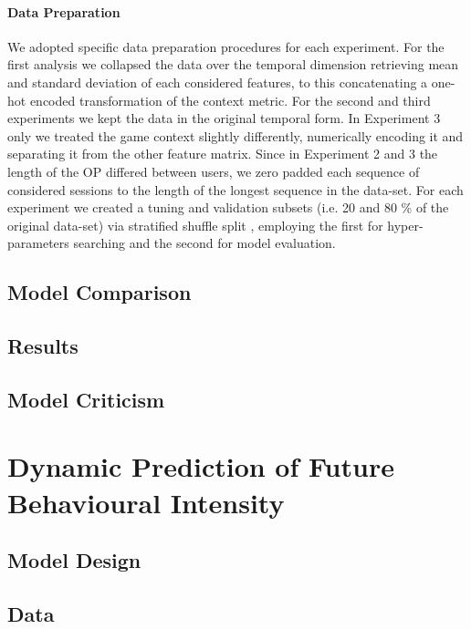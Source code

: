 \paragraph*{Data Preparation}We adopted specific data preparation procedures for each experiment. For the first analysis we collapsed the data over the temporal dimension retrieving mean and standard deviation of each considered features, to this concatenating a one-hot encoded transformation of the context metric. For the second and third experiments we kept the data in the original temporal form. In Experiment 3 only we treated the game context slightly differently, numerically encoding it and separating it from the other feature matrix. Since in Experiment 2 and 3 the length of the OP differed between users, we zero padded each sequence of considered sessions to the length of the longest sequence in the data-set. For each experiment we created a tuning and validation subsets (i.e. 20 and 80 \% of the original data-set) via stratified shuffle split \cite{scikit-learn}, employing the first for hyper-parameters searching and the second for model evaluation.

\subsection{Model Comparison}
\lorem

\subsection{Results}
\lorem

\subsection{Model Criticism}
\lorem

\section{Dynamic Prediction of Future Behavioural Intensity}
\label{model_architecture_1}
\lorem

\subsection{Model Design}
\lorem

\subsection{Data}
\lorem

